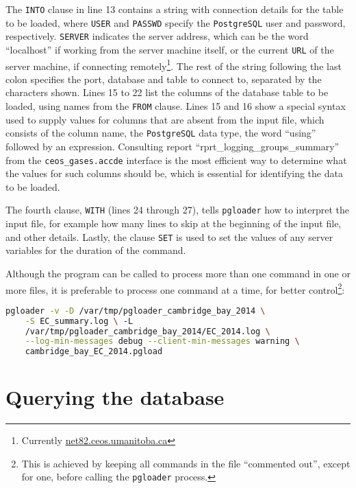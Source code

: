 \documentclass[12pt,letterpaper,titlepage,headings=small,numbers=noenddot]%
{scrartcl}
\begin{document}
The \texttt{INTO} clause in line 13 contains a string with connection
details for the table to be loaded, where \texttt{USER} and \texttt{PASSWD}
specify the \texttt{PostgreSQL} user and password, respectively.
\texttt{SERVER} indicates the server address, which can be the word
``localhost'' if working from the server machine itself, or the current
\texttt{URL} of the server machine, if connecting
remotely\footnote{Currently \url{net82.ceos.umanitoba.ca}}.  The rest of
the string following the last colon specifies the port, database and table
to connect to, separated by the characters shown.  Lines 15 to 22 list the
columns of the database table to be loaded, using names from the
\texttt{FROM} clause.  Lines 15 and 16 show a special syntax used to supply
values for columns that are absent from the input file, which consists of
the column name, the \texttt{PostgreSQL} data type, the word ``using''
followed by an expression.  Consulting report
``rprt\_logging\_groups\_summary'' from the \texttt{ceos\_gases.accde}
interface is the most efficient way to determine what the values for such
columns should be, which is essential for identifying the data to be
loaded.

The fourth clause, \texttt{WITH} (lines 24 through 27), tells
\texttt{pgloader} how to interpret the input file, for example how many
lines to skip at the beginning of the input file, and other details.
Lastly, the clause \texttt{SET} is used to set the values of any server
variables for the duration of the command.

Although the program can be called to process more than one command in one
or more files, it is preferable to process one command at a time, for
better control\footnote{This is achieved by keeping all commands in the
  file ``commented out'', except for one, before calling the
  \texttt{pgloader} process.}:

\begin{lstlisting}[language=bash, morekeywords={pgloader}, backgroundcolor=\color{lightgray}]
pgloader -v -D /var/tmp/pgloader_cambridge_bay_2014 \
    -S EC_summary.log \ -L
    /var/tmp/pgloader_cambridge_bay_2014/EC_2014.log \
    --log-min-messages debug --client-min-messages warning \
    cambridge_bay_EC_2014.pgload
\end{lstlisting}

\section{Querying the database}
\label{sec:querying-database}
\end{document}
